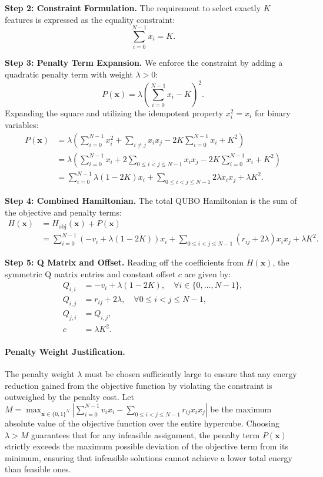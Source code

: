 \documentclass[12pt]{article}
\begin{document}
\textbf{Step 2: Constraint Formulation.}
The requirement to select exactly $K$ features is expressed as the equality constraint:
\begin{equation}
    \sum_{i=0}^{N-1} x_i = K.
\end{equation}

\textbf{Step 3: Penalty Term Expansion.}
We enforce the constraint by adding a quadratic penalty term with weight $\lambda > 0$:
\begin{equation}
    P(\mathbf{x}) = \lambda \left( \sum_{i=0}^{N-1} x_i - K \right)^2.
\end{equation}
Expanding the square and utilizing the idempotent property $x_i^2 = x_i$ for binary variables:
\begin{align}
    P(\mathbf{x}) &= \lambda \left( \sum_{i=0}^{N-1} x_i^2 + \sum_{i \neq j} x_i x_j - 2K \sum_{i=0}^{N-1} x_i + K^2 \right) \\
    &= \lambda \left( \sum_{i=0}^{N-1} x_i + 2 \sum_{0 \le i < j \le N-1} x_i x_j - 2K \sum_{i=0}^{N-1} x_i + K^2 \right) \\
    &= \sum_{i=0}^{N-1} \lambda(1 - 2K) x_i + \sum_{0 \le i < j \le N-1} 2\lambda x_i x_j + \lambda K^2.
\end{align}

\textbf{Step 4: Combined Hamiltonian.}
The total QUBO Hamiltonian is the sum of the objective and penalty terms:
\begin{align}
    H(\mathbf{x}) &= H_{\text{obj}}(\mathbf{x}) + P(\mathbf{x}) \\
    &= \sum_{i=0}^{N-1} \left( -v_i + \lambda(1 - 2K) \right) x_i + \sum_{0 \le i < j \le N-1} \left( r_{ij} + 2\lambda \right) x_i x_j + \lambda K^2.
\end{align}

\textbf{Step 5: Q Matrix and Offset.}
Reading off the coefficients from $H(\mathbf{x})$, the symmetric Q matrix entries and constant offset $c$ are given by:
\begin{align}
    Q_{i,i} &= -v_i + \lambda(1 - 2K), \quad \forall i \in \{0, \dots, N-1\}, \\
    Q_{i,j} &= r_{ij} + 2\lambda, \quad \forall 0 \le i < j \le N-1, \\
    Q_{j,i} &= Q_{i,j}, \\
    c &= \lambda K^2.
\end{align}

\paragraph{Penalty Weight Justification.}
The penalty weight $\lambda$ must be chosen sufficiently large to ensure that any energy reduction gained from the objective function by violating the constraint is outweighed by the penalty cost. Let $M = \max_{\mathbf{x} \in \{0,1\}^N} \left| \sum_{i=0}^{N-1} v_i x_i - \sum_{0 \le i < j \le N-1} r_{ij} x_i x_j \right|$ be the maximum absolute value of the objective function over the entire hypercube. Choosing $\lambda > M$ guarantees that for any infeasible assignment, the penalty term $P(\mathbf{x})$ strictly exceeds the maximum possible deviation of the objective term from its minimum, ensuring that infeasible solutions cannot achieve a lower total energy than feasible ones.
\end{document}

